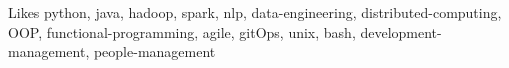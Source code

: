 

\begin{cvskills}

  \cvskill
    {Likes} %
    {python, java, hadoop, spark, nlp, data-engineering, distributed-computing, OOP, functional-programming, agile, gitOps, unix, bash, development-management, people-management} %


\end{cvskills}
